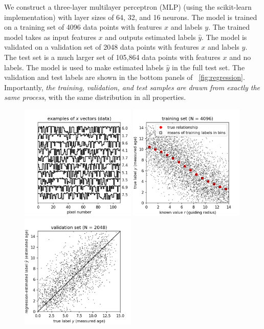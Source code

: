 \documentclass[11pt]{article}
\begin{document}
We construct a three-layer multilayer perceptron (MLP) (using the scikit-learn implementation) with layer sizes of 64, 32, and 16 neurons.
The model is trained on a training set of 4096 data points with features $x$ and labels $y$.
The trained model takes as input features $x$ and outputs estimated labels $\hat{y}$.
The model is validated on a validation set of 2048 data points with features $x$ and labels $y$.
The test set is a much larger set of 105,864 data points with features $x$ and no labels.
The model is used to make estimated labels $\hat{y}$ in the full test set.
The validation and test labels are shown in the bottom panels of \figurename~\ref{fig:regression}.
Importantly, \emph{the training, validation, and test samples are drawn from exactly the same process}, with the same distribution in all properties.
\begin{figure}[p!]
\includegraphics[width=0.49\textwidth]{notebooks/data_examples.png}
\includegraphics[width=0.49\textwidth]{notebooks/training_data.png} \\
\includegraphics[width=0.49\textwidth]{notebooks/validation.png}

\end{figure}
\end{document}
